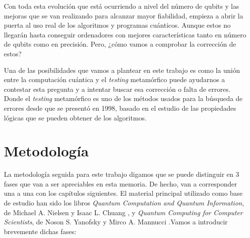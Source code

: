 Con toda esta evolución que está ocurriendo a nivel del número de qubits y las mejoras que se van realizando para alcanzar mayor fiabilidad, empieza a abrir la puerta al uso real de los algoritmos y programas cuánticos. Aunque estos no llegarán hasta conseguir ordenadores con mejores características tanto en número de qubits como en precisión. Pero, ¿cómo vamos a comprobar la corrección de estos? \newline 

Una de las posibilidades que vamos a plantear en este trabajo es como la unión entre la computación cuántica y el \textit{testing} metamórfico puede ayudarnos a contestar esta pregunta y a intentar buscar esa corrección o falta de errores. Donde el \textit{testing} metamórfico es uno de los métodos usados para la búsqueda de errores desde que se presentó en 1998\cite{Note:MT:1998}, basado en el estudio de las propiedades lógicas que se pueden obtener de los algoritmos.

\section{Metodología}

La metodología seguida para este trabajo digamos que se puede distinguir en 3 fases que van a ser apreciables en esta memoria. De hecho, van a corresponder una a una con los capítulos siguientes. El material principal utilizado como base de estudio han sido los libros \textit{Quantum Computation and Quantum Information}, de Michael A. Nielsen y Isaac L. Chuang \cite{B:Nielsen:2002}, y \textit{Quantum Computing for Computer Scientists}, de Noson S. Yanofsky y Mirco A. Mannucci \cite{B:QuantumScientist:2008}.Vamos a introducir brevemente dichas fases: 

